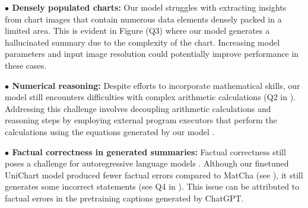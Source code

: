 \noindent \textbf{$\bullet$ {Densely populated charts:}} Our model struggles with extracting insights from chart images that contain numerous data elements densely packed in a limited area.  This is evident in Figure  (Q3) where our model generates a hallucinated summary due to the complexity of the chart. Increasing model parameters and input image resolution could potentially improve performance in these cases.

\noindent \textbf{$\bullet$ {Numerical reasoning:}} Despite efforts to incorporate mathematical skills, our model still encounters difficulties with complex arithmetic calculations (Q2 in ).   
Addressing this challenge involves decoupling arithmetic calculations and reasoning steps by employing external program executors that perform the calculations using the equations generated by our model \cite{gao2022pal}. 

\noindent \textbf{$\bullet$ {Factual correctness in generated summaries:}} Factual correctness still poses a challenge for autoregressive language models \cite{lin-etal-2022-truthfulqa,ChatGPT,zhao2023verify}. Although our finetuned UniChart model produced fewer factual errors compared to MatCha (see ), it still generates some  incorrect statements (see Q4 in  ). This issue can be attributed to factual errors in the pretraining captions generated by ChatGPT.

